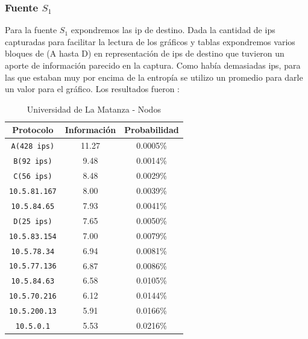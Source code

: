 \documentclass[final,inline,narroweqnarray,a4paper]{ieee}
\begin{document}
\subsubsection{Fuente $S_1$}

Para la fuente $S_1$ expondremos las ip de destino. Dada la cantidad de ips capturadas para facilitar la lectura de los gráficos y tablas expondremos varios bloques de (A hasta D) en representación de ips de destino que tuvieron un aporte de información parecido en la captura. Como había demasiadas ips, para las que estaban muy por encima de la entropía se utilizo un promedio para darle un valor para el gráfico. Los resultados fueron :

\begin{table}[H]
    \begin{center}
        \begin{tabular}{|c|c|c|}
            \hline
            \textbf{Protocolo} & \textbf{Información} & \textbf{Probabilidad} \\ \hline
            \texttt{A(428 ips)}   &11.27       & 0.0005\%     \\ \hline
            \texttt{B(92 ips)}    &9.48        & 0.0014\%     \\ \hline
            \texttt{C(56 ips)}    &8.48        & 0.0029\%     \\ \hline
	    \texttt{10.5.81.167}  &8.00        & 0.0039\%     \\ \hline
	    \texttt{10.5.84.65}   &7.93        & 0.0041\%     \\ \hline
            \texttt{D(25 ips)}    &7.65        & 0.0050\%     \\ \hline
	    \texttt{10.5.83.154}  &7.00        & 0.0079\%     \\ \hline
	    \texttt{10.5.78.34}   &6.94        & 0.0081\%     \\ \hline
	    \texttt{10.5.77.136}  &6.87        & 0.0086\%     \\ \hline
	    \texttt{10.5.84.63}   &6.58        & 0.0105\%     \\ \hline
	    \texttt{10.5.70.216}  &6.12        & 0.0144\%     \\ \hline
	    \texttt{10.5.200.13}  &5.91        & 0.0166\%     \\ \hline
	    \texttt{10.5.0.1}     &5.53        & 0.0216\%     \\ \hline
        \end{tabular}
        \caption{Universidad de La Matanza - Nodos}
        \label{table:universidadLMS1}
    \end{center}
\end{table}
\end{document}
